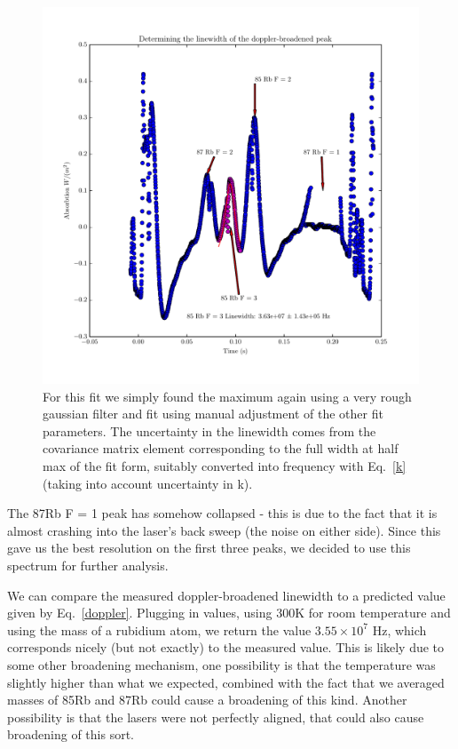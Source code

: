 \documentclass{article}
\begin{document}
  \begin{figure}[!htb]
    \centering
    \includegraphics[scale=.75]{../plots/rb85_fwhm.pdf}
    \caption{For this fit we simply found the maximum again using a very rough gaussian filter and fit using manual adjustment of the other fit parameters.  The uncertainty in the linewidth comes from the covariance matrix element corresponding to the full width at half max of the fit form, suitably converted into frequency with Eq.~\ref{k} (taking into account uncertainty in k).}
    \label{full_spectrum}
  \end{figure}

  \hspace{.25cm}

  The 87Rb F = 1 peak has somehow collapsed - this is due to the fact that it is almost crashing into the laser's back sweep (the noise on either side).  Since this gave us the best resolution on the first three peaks, we decided to use this spectrum for further analysis.

  \hspace{.25cm}

  We can compare the measured doppler-broadened linewidth to a predicted value given by Eq.~\ref{doppler}.  Plugging in values, using 300K for room temperature and using the mass of a rubidium atom, we return the value $3.55 \times 10^7$ Hz, which corresponds nicely (but not exactly) to the measured value.  This is likely due to some other broadening mechanism, one possibility is that the temperature was slightly higher than what we expected, combined with the fact that we averaged masses of 85Rb and 87Rb could cause a broadening of this kind.  Another possibility is that the lasers were not perfectly aligned, that could also cause broadening of this sort.
\end{document}
